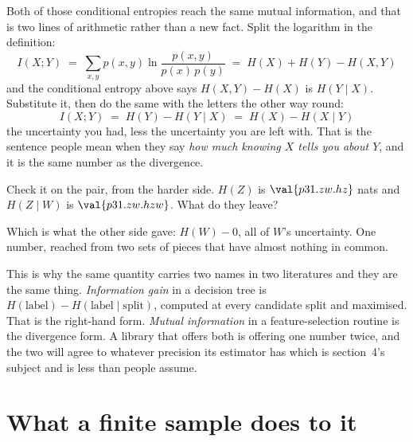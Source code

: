 \begin{fr}
Both of those conditional entropies reach the same mutual information, and
that is two lines of arithmetic rather than a new fact. Split the logarithm
in the definition:
\[ I(X; Y) \;=\; \sum_{x, y} p(x, y) \ln \frac{p(x, y)}{p(x)\,p(y)}
   \;=\; H(X) + H(Y) - H(X, Y) \]
and the conditional entropy above says $H(X, Y) - H(X)$ is $H(Y \mid X)$.
Substitute it, then do the same with the letters the other way round:
\[ I(X; Y) \;=\; H(Y) - H(Y \mid X) \;=\; H(X) - H(X \mid Y) \]
\dash{} the uncertainty you had, less the uncertainty you are left with.
That is the sentence people mean when they say \emph{how much knowing $X$
tells you about $Y$}, and it is the same number as the divergence.

Check it on the pair, from the harder side. $H(Z)$ is $\val{p31.zw.hz}$ nats
and $H(Z \mid W)$ is $\val{p31.zw.hzw}$. What do they leave?
\dotline
\nextframe
\end{fr}

\begin{fr}

Which is what the other side gave: $H(W) - 0$, all of $W$'s uncertainty.
One number, reached from two sets of pieces that have almost nothing in
common.

\begin{aibox}
This is why the same quantity carries two names in two literatures and they
are the same thing. \emph{Information gain} in a decision tree is
$H(\text{label}) - H(\text{label} \mid \text{split})$, computed at every
candidate split and maximised. That is the right-hand form. \emph{Mutual
information} in a feature-selection routine is the divergence form. A
library that offers both is offering one number twice, and the two will
agree to whatever precision its estimator has \dash{} which is section~4's
subject and is less than people assume.
\end{aibox}

\end{fr}

\section{What a finite sample does to it}
\label{sec:P31-estimation}

